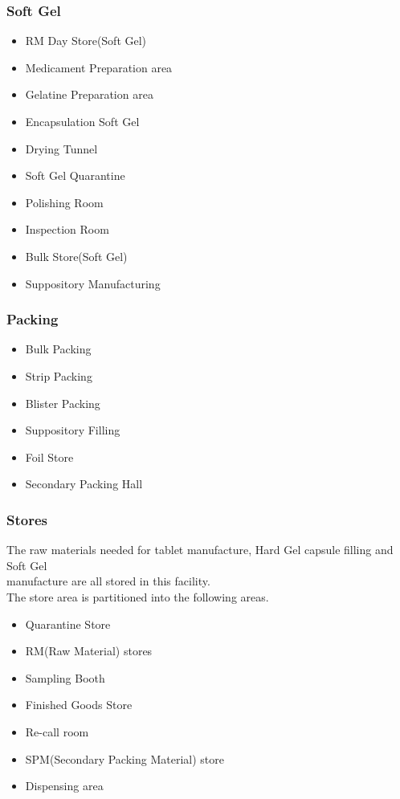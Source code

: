 \documentclass[a4paper,12pt]{article}
\begin{document}
			\subsubsection{Soft Gel}
			
			\begin{itemize}
				\item RM Day Store(Soft Gel)
				\item Medicament Preparation area
				\item Gelatine Preparation area
				\item Encapsulation Soft Gel
				\item Drying Tunnel
				\item Soft Gel Quarantine
				\item Polishing Room
				\item Inspection Room
				\item Bulk Store(Soft Gel)
				\item Suppository Manufacturing
			\end{itemize}
			
			
			\subsubsection{Packing}
		
			\begin{itemize}
				\item Bulk Packing 
				\item Strip Packing
				\item Blister Packing
				\item Suppository Filling
				\item Foil Store
				\item Secondary Packing Hall
			\end{itemize}
			
			\subsubsection{Stores}
			The raw materials needed for tablet manufacture, Hard Gel capsule filling and Soft Gel \\ manufacture are all stored in this facility.\\
			The store area is partitioned into the following areas.
			
			\begin{itemize}
				\item Quarantine Store
				\item RM(Raw Material) stores
				\item Sampling Booth
				\item Finished Goods Store
				\item Re-call room
				\item SPM(Secondary Packing Material) store
				\item Dispensing area
			\end{itemize}
\end{document}

